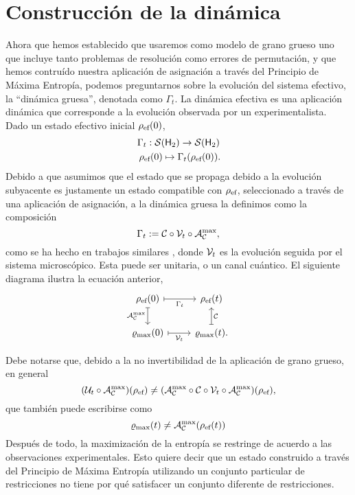 \section{Construcción de la dinámica}\label{sec:ch2dycon}

Ahora que hemos establecido que usaremos como modelo de grano grueso uno que incluye tanto problemas de resolución como errores de permutación, y que hemos contruído nuestra aplicación de asignación a través del Principio de Máxima Entropía, podemos preguntarnos sobre la evolución del sistema efectivo, la ``dinámica gruesa'', denotada como $\Gamma_t$. La dinámica efectiva es una aplicación dinámica que corresponde a la evolución observada por un experimentalista. Dado un estado efectivo inicial $\rho_{\text{ef}}(0)$,
\begin{gather}
\Gamma_{t}:\mcS(\hilbert_2)\rightarrow \mcS(\hilbert_2)\nonumber\\
\rho_{\ef}(0) \mapsto \Gamma_{t}(\rho_{\ef}(0))\rlap{.}\nonumber
\end{gather}
Debido a que asumimos que el estado que se propaga debido a la evolución subyacente es justamente un estado compatible con $\rho_{\text{ef}}$, seleccionado a través de una aplicación de asignación, a la dinámica gruesa la definimos como la composición
\begin{equation}\label{eq:EffectiveDynamics}
\Gamma_t:=\mathcal{C} \circ \mathcal{V}_t \circ \mathcal{A}_{\mathcal{C}}^{\max},
\end{equation}
como se ha hecho en trabajos similares \cite{CGEmergingDynamics}, donde $\mathcal{V}_{t}$ es la evolución seguida por el sistema microscópico. Esta puede ser unitaria, o un canal cuántico. El siguiente diagrama ilustra la ecuación anterior,
\[\begin{tikzcd}[arrows={<-|}]
    \rho_{\ef}(0)  & \rho_{\ef}(t) \arrow{l}{\Gamma_{t}} \arrow{d}{\mcC}\\
\varrho_{\max}(0) \arrow{u}{\mcA_{\mcC}^{\max}} & \varrho_{\max}(t). \arrow{l}{\mcV_{t}}
\end{tikzcd}
\]


Debe notarse que, debido a la no invertibilidad de la aplicación de grano grueso, en general
\begin{equation}
    (\mathcal{U}_{t}\circ\mathcal{A}_{\mathcal{C}}^{\max})(\rho_{\text{ef}}) \neq (\mathcal{A}_{\mathcal{C}}^{\max}\circ\mathcal{C} \circ \mathcal{V}_{t} \circ \mathcal{A}_{\mathcal{C}}^{\max})(\rho_{\text{ef}}),\nonumber
\end{equation}
que también puede escribirse como
\begin{equation}
    \varrho_{\max}(t)\neq\mathcal{A}_{\mathcal{C}}^{\max}(\rho_{\text{ef}}(t))\nonumber
\end{equation}
Después de todo, la maximización de la entropía se restringe de acuerdo a las observaciones experimentales. Esto quiere decir que un estado construido a través del Principio de Máxima Entropía utilizando un conjunto particular de restricciones no tiene por qué satisfacer un conjunto diferente de restricciones.

